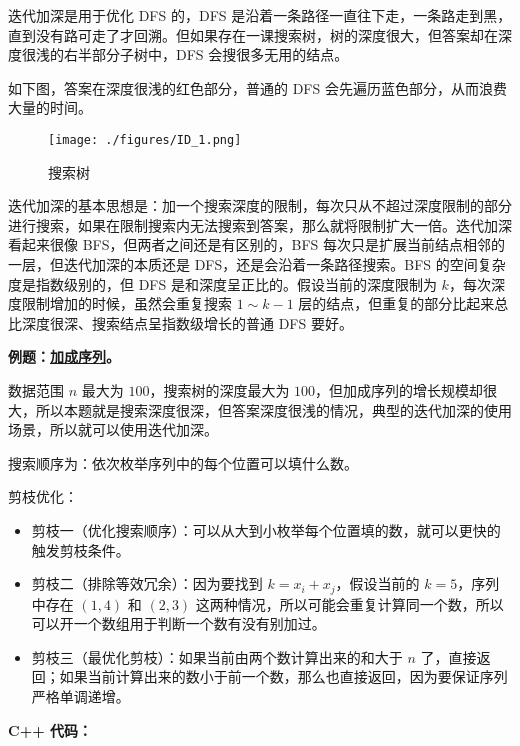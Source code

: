 

\begin{issues}
\issueDraft
\end{issues}

迭代加深是用于优化 DFS 的，DFS 是沿着一条路径一直往下走，一条路走到黑，直到没有路可走了才回溯。但如果存在一课搜索树，树的深度很大，但答案却在深度很浅的右半部分子树中，DFS 会搜很多无用的结点。

如下图，答案在深度很浅的红色部分，普通的 DFS 会先遍历蓝色部分，从而浪费大量的时间。

\begin{figure}[ht]
\centering
\texttt{[image: ./figures/ID\_1.png]}
\caption{搜索树} \label{ID_fig1}
\end{figure}

迭代加深的基本思想是：加一个搜索深度的限制，每次只从不超过深度限制的部分进行搜索，如果在限制搜索内无法搜索到答案，那么就将限制扩大一倍。迭代加深看起来很像 BFS，但两者之间还是有区别的，BFS 每次只是扩展当前结点相邻的一层，但迭代加深的本质还是 DFS，还是会沿着一条路径搜索。BFS 的空间复杂度是指数级别的，但 DFS 是和深度呈正比的。假设当前的深度限制为 $k$，每次深度限制增加的时候，虽然会重复搜索 $1 \sim k - 1$ 层的结点，但重复的部分比起来总比深度很深、搜索结点呈指数级增长的普通 DFS 要好。

\textbf{例题：\href{http://poj.org/problem?id=2248}{加成序列}。}

数据范围 $n$ 最大为 $100$，搜索树的深度最大为 $100$，但加成序列的增长规模却很大，所以本题就是搜索深度很深，但答案深度很浅的情况，典型的迭代加深的使用场景，所以就可以使用迭代加深。

搜索顺序为：依次枚举序列中的每个位置可以填什么数。

剪枝优化：
\begin{itemize}
\item 剪枝一（优化搜索顺序）：可以从大到小枚举每个位置填的数，就可以更快的触发剪枝条件。
\item 剪枝二（排除等效冗余）：因为要找到 $k = x_i + x_j$，假设当前的 $k = 5$，序列中存在 $(1, 4)$ 和 $(2, 3)$ 这两种情况，所以可能会重复计算同一个数，所以可以开一个数组用于判断一个数有没有别加过。
\item 剪枝三（最优化剪枝）：如果当前由两个数计算出来的和大于 $n$ 了，直接返回；如果当前计算出来的数小于前一个数，那么也直接返回，因为要保证序列严格单调递增。
\end{itemize}

\textbf{C++ 代码：}

